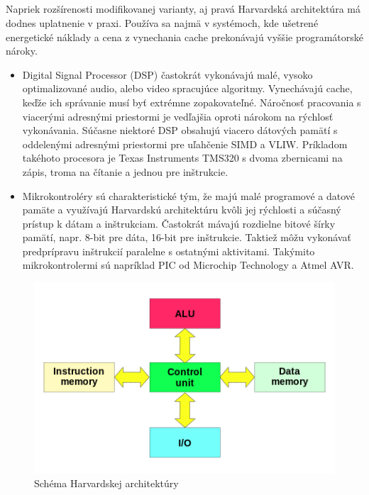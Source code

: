 \documentclass[11pt,a4paper]{report}
\begin{document}
\subparagraph{}Napriek rozšírenosti modifikovanej varianty, aj pravá Harvardská architektúra má dodnes uplatnenie v praxi. Používa sa najmä v systémoch, kde ušetrené energetické náklady a cena z vynechania cache prekonávajú vyššie programátorské nároky.
\begin{itemize}
\item Digital Signal Processor (DSP) častokrát vykonávajú malé, vysoko optimalizované audio, alebo video spracujúce algoritmy. Vynechávajú cache, keďže ich správanie musí byť extrémne zopakovateľné. Náročnosť pracovania s viacerými adresnými priestormi je vedľajšia oproti nárokom na rýchlosť vykonávania. Súčasne niektoré DSP obsahujú viacero dátových pamätí s oddelenými adresnými priestormi pre uľahčenie SIMD a VLIW. Príkladom takéhoto procesora je Texas Instruments TMS320 s dvoma zbernicami na zápis, troma na čítanie a jednou pre inštrukcie.
\item Mikrokontroléry sú charakteristické tým, že majú malé programové a datové pamäte a využívajú Harvardskú architektúru kvôli jej rýchlosti a súčasný prístup k dátam a inštrukciam. Častokrát mávajú rozdielne bitové šírky pamätí, napr. 8-bit pre dáta, 16-bit pre inštrukcie. Taktiež môžu vykonávať predprípravu inštrukcií paralelne s ostatnými aktivitami. Takýmito mikrokontrolermi sú napríklad PIC od Microchip Technology a Atmel AVR.

\end{itemize}

\begin{figure}[ht]
        \centering
        \includegraphics[scale=0.6]{images/Harvard_Architecture}
        \caption{Schéma Harvardskej architektúry}
        \label{Harvard:}
\end{figure}
\newpage
\end{document}
